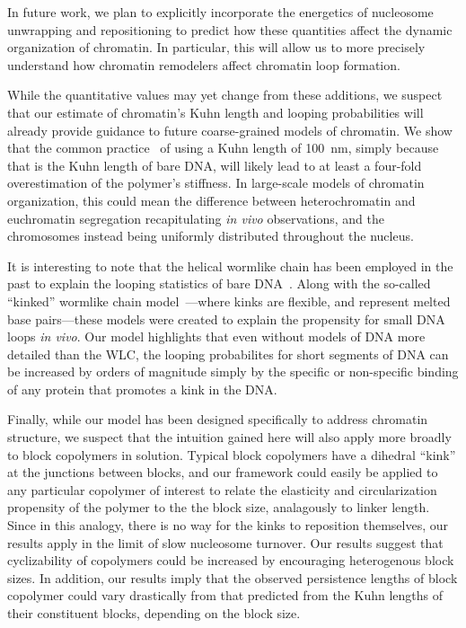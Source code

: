 \documentclass[%
 reprint,
superscriptaddress,
showpacs,preprintnumbers,
 amsmath,amssymb,
 aps,
 prl,
]{revtex4-1}
\begin{document}
    In future work, we plan to explicitly incorporate the energetics of nucleosome unwrapping
    and repositioning to predict how these quantities affect the dynamic
    organization of chromatin. In particular, this will allow us to more
    precisely understand how chromatin remodelers affect chromatin loop
    formation.

While the quantitative values may yet change from these additions, we suspect that our estimate of chromatin's Kuhn length and looping probabilities will already provide
    guidance to future coarse-grained models of chromatin.
We show that the common practice~\cite{macphersonInPress,nuebler2018}
    of using a Kuhn length of \SI{100}{\nano\metre}, simply because that is the
    Kuhn length of bare DNA, will likely lead to at least a four-fold
    overestimation of the polymer's stiffness. %
In large-scale models of chromatin organization, this could mean the difference
    between heterochromatin and euchromatin segregation recapitulating
    \textit{in vivo} observations, and the chromosomes instead being uniformly
    distributed throughout the nucleus.

It is interesting to note that the helical wormlike chain has been employed
    in the past to explain the looping statistics of bare DNA~\cite{shimada1984,
    liu2011a}.
Along with the so-called ``kinked'' wormlike chain model~\cite{wiggins2005,
    popov2005}---where kinks are flexible, and represent melted base
    pairs---these models were created to explain the propensity for small DNA
    loops \textit{in vivo}.
Our model highlights that even without models of DNA more detailed than the WLC,
    the looping probabilites for short segments of DNA can be increased by
    orders of magnitude simply by the specific or non-specific binding of any
    protein that promotes a kink in the DNA.\@

Finally, while our model has been designed specifically to address chromatin
    structure, we suspect that the intuition gained here will also apply more
    broadly to block copolymers in solution.
Typical block copolymers have a dihedral ``kink'' at the junctions between
    blocks, and our framework could easily be applied to any particular
    copolymer of interest to relate the elasticity and circularization
    propensity of the polymer to the the block size, analagously to linker
    length.
Since in this analogy, there is no way for the kinks to reposition themselves,
    our results apply in the limit of slow nucleosome turnover.
Our results suggest that cyclizability of copolymers could be increased by
    encouraging heterogenous block sizes.
In addition, our results imply that the observed persistence lengths of block
    copolymer could vary drastically from that predicted from the Kuhn lengths
    of their constituent blocks, depending on the block size.
\end{document}
